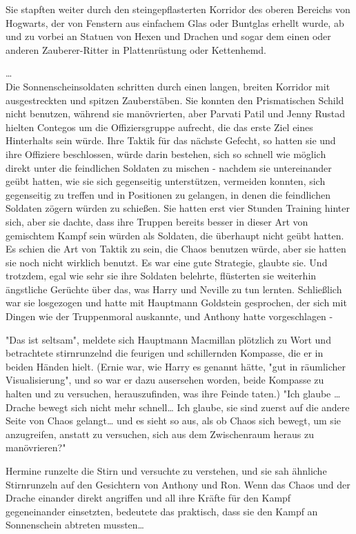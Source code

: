 {Sie stapften weiter durch den steingepflasterten Korridor des oberen Bereichs von Hogwarts, der von Fenstern aus einfachem Glas oder Buntglas erhellt wurde, ab und zu vorbei an Statuen von Hexen und Drachen und sogar dem einen oder anderen Zauberer-Ritter in Plattenrüstung oder Kettenhemd.

…\\ Die Sonnenscheinsoldaten schritten durch einen langen, breiten Korridor mit ausgestreckten und spitzen Zauberstäben. Sie konnten den Prismatischen Schild nicht benutzen, während sie manövrierten, aber Parvati Patil und Jenny Rustad hielten Contegos um die Offiziersgruppe aufrecht, die das erste Ziel eines Hinterhalts sein würde. Ihre Taktik für das nächste Gefecht, so hatten sie und ihre Offiziere beschlossen, würde darin bestehen, sich so schnell wie möglich direkt unter die feindlichen Soldaten zu mischen - nachdem sie untereinander geübt hatten, wie sie sich gegenseitig unterstützen, vermeiden konnten, sich gegenseitig zu treffen und in Positionen zu gelangen, in denen die feindlichen Soldaten zögern würden zu schießen. Sie hatten erst vier Stunden Training hinter sich, aber sie dachte, dass ihre Truppen bereits besser in dieser Art von gemischtem Kampf sein würden als Soldaten, die überhaupt nicht geübt hatten. Es schien die Art von Taktik zu sein, die Chaos benutzen würde, aber sie hatten sie noch nicht wirklich benutzt. Es war eine gute Strategie, glaubte sie. Und trotzdem, egal wie sehr sie ihre Soldaten belehrte, flüsterten sie weiterhin ängstliche Gerüchte über das, was Harry und Neville zu tun lernten. Schließlich war sie losgezogen und hatte mit Hauptmann Goldstein gesprochen, der sich mit Dingen wie der Truppenmoral auskannte, und Anthony hatte vorgeschlagen -

"Das ist seltsam", meldete sich Hauptmann Macmillan plötzlich zu Wort und betrachtete stirnrunzelnd die feurigen und schillernden Kompasse, die er in beiden Händen hielt. (Ernie war, wie Harry es genannt hätte, "gut in räumlicher Visualisierung", und so war er dazu ausersehen worden, beide Kompasse zu halten und zu versuchen, herauszufinden, was ihre Feinde taten.) "Ich glaube … Drache bewegt sich nicht mehr schnell… Ich glaube, sie sind zuerst auf die andere Seite von Chaos gelangt… und es sieht so aus, als ob Chaos sich bewegt, um sie anzugreifen, anstatt zu versuchen, sich aus dem Zwischenraum heraus zu manövrieren?"

Hermine runzelte die Stirn und versuchte zu verstehen, und sie sah ähnliche Stirnrunzeln auf den Gesichtern von Anthony und Ron. Wenn das Chaos und der Drache einander direkt angriffen und all ihre Kräfte für den Kampf gegeneinander einsetzten, bedeutete das praktisch, dass sie den Kampf an Sonnenschein abtreten mussten…

}
